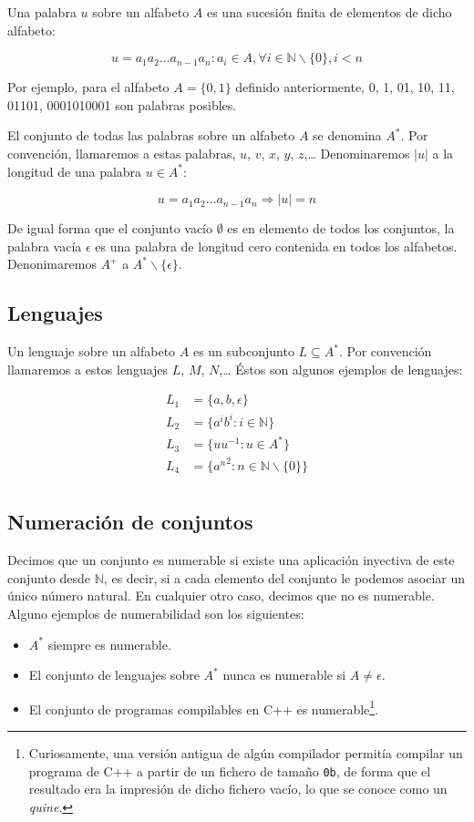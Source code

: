 Una palabra $u$ sobre un alfabeto $A$ es una sucesión finita de elementos de dicho alfabeto:

\[u = a_1 a_2 \ldots a_{n-1} a_n : a_i \in A, \forall i \in \mathbb{N}\backslash\{0\}, i < n\]

Por ejemplo, para el alfabeto $A=\{0,1\}$ definido anteriormente, 0, 1, 01, 10, 11, 01101, 0001010001 son palabras posibles.

El conjunto de todas las palabras sobre un alfabeto $A$ se denomina $A^*$.
Por convención, llamaremos a estas palabras, $u$, $v$, $x$, $y$, $z$,\ldots
Denominaremos $|u|$ a la longitud de una palabra $u \in A^*$:

\[u = a_1 a_2 \ldots a_{n-1} a_n \Rightarrow |u| = n\]

De igual forma que el conjunto vacío $\emptyset$ es en elemento de todos los conjuntos, la palabra vacía $\epsilon$ es una palabra de longitud cero contenida en todos los alfabetos.
Denonimaremos $A^+$ a $A^*\backslash\{\epsilon\}$.

\subsection{Lenguajes}

Un lenguaje sobre un alfabeto $A$ es un subconjunto $L \subseteq A^*$.
Por convención llamaremos a estos lenguajes $L$, $M$, $N$,\ldots
Éstos son algunos ejemplos de lenguajes:

\begin{align*}
	L_1 &= \{a,b,\epsilon\} \\
	L_2 &= \{a^i b^i : i \in\mathbb{N}\} \\
	L_3 &= \{uu^{-1} : u \in A^*\} \\
	L_4 &= \{{a^n}^2 : n \in\mathbb{N}\backslash\{0\}\} \\
\end{align*}

\subsection{Numeración de conjuntos}

Decimos que un conjunto es numerable si existe una aplicación inyectiva de este conjunto desde $\mathbb{N}$, es decir, si a cada elemento del conjunto le podemos asociar un único número natural.
En cualquier otro caso, decimos que no es numerable.
Alguno ejemplos de numerabilidad son los siguientes:

\begin{itemize}
	\item $A^*$ siempre es numerable.
	\item El conjunto de lenguajes sobre $A^*$ nunca es numerable si $A \neq \epsilon$.
	\item El conjunto de programas compilables en C++ es numerable\footnote{%
		Curiosamente, una versión antigua de algún compilador permitía compilar un programa de C++ a partir de un fichero de tamaño \texttt{0b}, de forma que el resultado era la impresión de dicho fichero vacío, lo que se conoce como un \textit{quine}.
	}.
\end{itemize}

